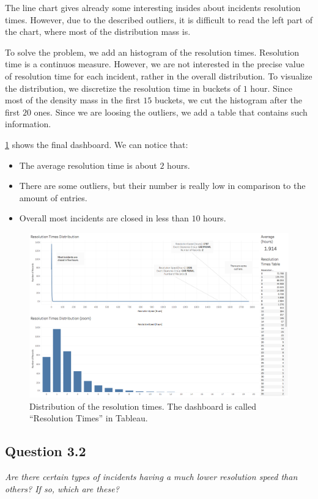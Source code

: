 The line chart gives already some interesting insides about incidents resolution times.
However, due to the described outliers, it is difficult to read the left part of the chart, where most of the distribution mass is.

To solve the problem, we add an histogram of the resolution times.
Resolution time is a continuos measure.
However, we are not interested in the precise value of resolution time for each incident, rather in the overall distribution.
To visualize the distribution, we discretize the resolution time in buckets of $1$ hour.
Since most of the density mass in the first $15$ buckets, we cut the histogram after the first $20$ ones.
Since we are loosing the outliers, we add a table that contains such information.

\cref{fig:3_1_resolution_speed} shows the final dashboard.
We can notice that:
\begin{itemize}
    \item The average resolution time is about $2$ hours.
    \item There are some outliers, but their number is really low in comparison to the amount of entries.
    \item Overall most incidents are closed in less than $10$ hours.
\end{itemize}

\begin{figure}[h]
	\centering
	\includegraphics[width=\columnwidth]{figures/3_1_resolution_speed}
	\caption{Distribution of the resolution times. The dashboard is called ``Resolution Times'' in Tableau.}
	\label{fig:3_1_resolution_speed}
\end{figure}


\subsection*{Question 3.2}
\textit{Are there certain types of incidents having a much lower resolution speed than others? If so, which are these?}

